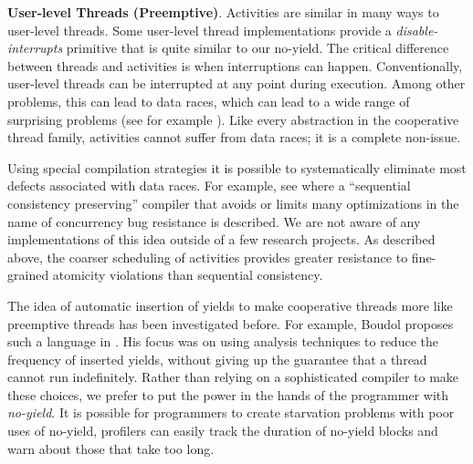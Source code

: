 \documentclass[9pt,preprint]{sigplanconf}
\begin{document}

\textbf{User-level Threads (Preemptive)}.
Activities are similar in many ways to user-level threads.
Some user-level thread implementations provide a \emph{disable-interrupts} primitive that is quite similar to our no-yield.
The critical difference between threads and activities is when interruptions can happen.
Conventionally, user-level threads can be interrupted at any point during execution.
Among other problems, this can lead to data races, which can lead to a wide range of surprising problems (see for example \cite{Boehm2011}).
Like every abstraction in the cooperative thread family, activities cannot suffer from data races; it is a complete non-issue.

Using special compilation strategies it is possible to systematically eliminate most defects associated with data races.
For example, see \cite{Singh2012} where a ``sequential consistency preserving'' compiler that avoids or limits many optimizations in the name of concurrency bug resistance is described.
We are not aware of any implementations of this idea outside of a few research projects.
As described above, the coarser scheduling of activities provides greater resistance to fine-grained atomicity violations than sequential consistency.

The idea of automatic insertion of yields to make cooperative threads more like preemptive threads has been investigated before.
For example, Boudol proposes such a language in \cite{Boudol2007}.
His focus was on using analysis techniques to reduce the frequency of inserted yields, without giving up the guarantee that a thread cannot run indefinitely.
Rather than relying on a sophisticated compiler to make these choices, we prefer to put the power in the hands of the programmer with \emph{no-yield}.
It is possible for programmers to create starvation problems with poor uses of no-yield, profilers can easily track the duration of no-yield blocks and warn about those that take too long.
\end{document}
